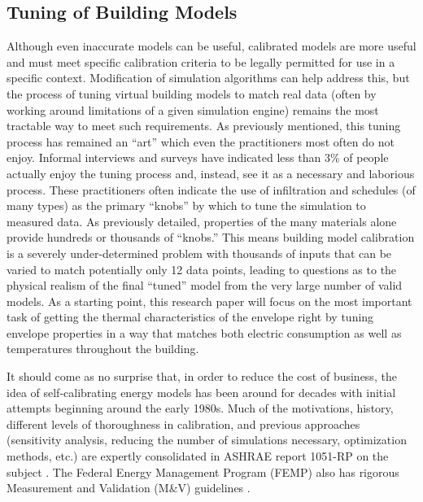 \documentclass[preprint, review, 12pt]{elsarticle}
\begin{document}
\subsection{Tuning of Building Models}
Although even inaccurate models can be useful, calibrated models are more useful and must meet specific calibration criteria to be legally permitted for use in a specific context. Modification of simulation algorithms can help address this, but the process of tuning virtual building models to match real data (often by working around limitations of a given simulation engine) remains the most tractable way to meet such requirements. As previously mentioned, this tuning process has remained an ``art'' which even the practitioners most often do not enjoy. Informal interviews and surveys have indicated less than 3\% of people actually enjoy the tuning process and, instead, see it as a necessary and laborious process. These practitioners often indicate the use of infiltration and schedules (of many types) as the primary ``knobs'' by which to tune the simulation to measured data. As previously detailed, properties of the many materials alone provide hundreds or thousands of ``knobs.'' This means building model calibration is a severely under-determined problem with thousands of inputs that can be varied to match potentially only 12 data points, leading to questions as to the physical realism of the final ``tuned'' model from the very large number of valid models. As a starting point, this research paper will focus on the
most important task of getting the thermal characteristics of the envelope right by tuning envelope properties in a way that matches both electric consumption as well as temperatures throughout the building.

It should come as no surprise that, in order to reduce the cost of business, the idea of self-calibrating energy models has been around for decades with initial attempts beginning around the early 1980s. Much of the motivations, history, different levels of thoroughness in calibration, and previous approaches (sensitivity analysis, reducing the number of simulations necessary, optimization methods, etc.) are expertly consolidated in ASHRAE report 1051-RP on the subject \cite{cit:reddy2006}. The Federal Energy Management Program (FEMP) also has rigorous Measurement and Validation (M\&V) guidelines \cite{cit:femp2008}.
\end{document}
